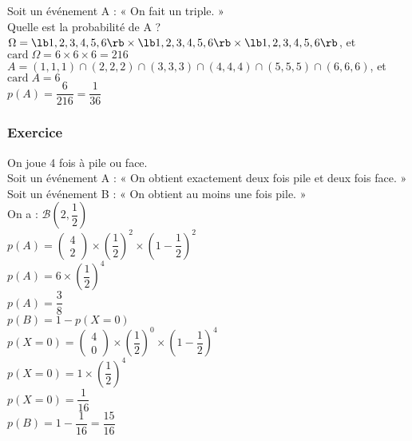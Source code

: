 Soit un événement A : « On fait un triple. » \\

Quelle est la probabilité de A ? \\

$\Omega = \lb 1,2,3,4,5,6 \rb \times \lb 1,2,3,4,5,6 \rb \times \lb 1,2,3,4,5,6 \rb $, et $\mathrm{card} \; \Omega = 6 \times 6 \times 6 = 216 $ \\

$ A = \left(1,1,1\right) \cap \left(2,2,2\right) \cap \left(3,3,3\right)\cap \left(4,4,4\right)\cap \left(5,5,5\right)\cap \left(6,6,6\right) $, et $\mathrm{card} \; A = 6 $ \\

$p\left(A\right) = \dfrac{6}{216} = \dfrac{1}{36} $ 

\subsubsection{Exercice }

On joue 4 fois à pile ou face. \\

Soit un événement A : « On obtient exactement deux fois pile et deux fois face. » \\

Soit un événement B : « On obtient au moins une fois pile. » \\

On a : $\mathcal{B} \left(2,\dfrac{1}{2}\right) $ \\

$p\left(A\right) = \left( \begin{array}{c} 4 \\ 2 \end{array} \right) \times \left(\dfrac{1}{2}\right)^2 \times \left( 1 - \dfrac{1}{2} \right)^2 $ \\

$ p\left(A\right) = 6 \times \left(\dfrac{1}{2} \right)^4 $ \\

$ p\left(A\right) = \dfrac{3}{8} $ \\

$ p\left(B\right) = 1 - p\left(X=0\right) $ \\

$p\left(X=0\right) = \left( \begin{array}{c} 4 \\ 0 \end{array} \right) \times \left(\dfrac{1}{2}\right)^0 \times \left(1 - \dfrac{1}{2} \right)^4 $ \\

$p\left(X=0\right) = 1 \times \left(\dfrac{1}{2}\right)^4 $ \\

$ p\left(X=0\right) = \dfrac{1}{16} $ \\

$ p\left(B\right) = 1 - \dfrac{1}{16} = \dfrac{15}{16} $ \\


\ifdefined\COMPLETE
\else
    
\fi